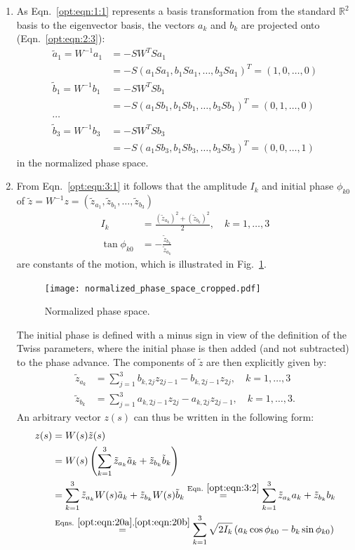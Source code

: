 \documentclass[english]{article}
\begin{document}
\begin{enumerate}
\item As Eqn.~\ref{opt:eqn:1:1} represents a basis transformation from the standard $\mathbb{R}^2$ basis to the eigenvector basis, the vectors $a_k$ and $b_k$ are projected onto (Eqn.~\ref{opt:eqn:2:3}):
\begin{align}\label{opt:eqn:3:2}
\tilde a_1=W^{-1}a_1&=-SW^TSa_1\nonumber\\
&=-S(a_1Sa_1,b_1Sa_1,\ldots,b_3Sa_1)^T=(1,0,\ldots,0)\nonumber\\
\tilde b_1=W^{-1}b_1&=-SW^TSb_1\nonumber\\
&=-S(a_1Sb_1,b_1Sb_1,\ldots,b_3Sb_1)^T=(0,1,\ldots,0)\\
\cdots & \nonumber\\
\tilde b_3=W^{-1}b_3&=-SW^TSb_3\nonumber\\
&=-S(a_1Sb_3,b_1Sb_3,\ldots,b_3Sb_3)^T=(0,0,\ldots,1)\nonumber
\end{align}
in the normalized phase space.
\item From Eqn.~\ref{opt:eqn:3:1} it follows that the amplitude $I_k$ and initial phase $\phi_{k0}$ of $\tilde z=W^{-1}z=(\tilde z_{a_1},\tilde z_{b_1},\ldots,\tilde z_{b_3})$ 
\begin{align}
I_k&=\frac{(\tilde z_{a_k})^2 +(\tilde z_{b_k})^2}{2}, \quad k=1,\ldots,3\label{opt:eqn:20a}\\
\tan\phi_{k0}&=-\frac{\tilde z_{b_k}}{\tilde z_{a_k}} \label{opt:eqn:20b}
\end{align}
are constants of the motion, which is illustrated in Fig.~\ref{opt:fig:1}.
\begin{figure}[h]
	\centering
	\texttt{[image: normalized\_phase\_space\_cropped.pdf]}
	\caption{Normalized phase space.\label{opt:fig:1}}
\end{figure}
The initial phase is defined with a minus sign in view of the definition of the Twiss parameters, where the initial phase is then added (and not subtracted) to the phase advance. The components of $\tilde z$ are then explicitly given by:
\begin{align}
\tilde z_{a_k}&= \sum_{j=1}^3  b_{k,2j} z_{2j-1}- b_{k,2j-1} z_{2j}, \quad k=1,\ldots,3\\
\tilde z_{b_k}&= \sum_{j=1}^3 a_{k,2j-1} z_{2j}- a_{k,2j} z_{2j-1}, \quad k=1,\ldots,3.
\end{align}
An arbitrary vector $z(s)$ can thus be written in the following form:
\begin{align}
 z(s)&=W(s)\tilde z(s)\nonumber\\
 &=W(s)\left(\sum_{k=1}^{3}\tilde z_{a_k}\tilde a_k + \tilde z_{b_k}\tilde b_k\right)\nonumber\\
 &=\sum_{k=1}^{3}\tilde z_{a_k}W(s)\tilde a_k + \tilde z_{b_k}W(s)\tilde b_k\overset{\rm Eqn.~\ref{opt:eqn:3:2}}{=}\sum_{k=1}^{3}\tilde z_{a_k}a_k + \tilde z_{b_k}b_k\nonumber\\
 &\overset{\rm Eqns.~\ref
 	{opt:eqn:20a},\ref{opt:eqn:20b}}=\sum_{k=1}^{3}\sqrt{2I_k}\left(a_k\cos{\phi_{k0}}-b_k\sin{\phi_{k0}}\right)
\end{align}
\end{enumerate}
\end{document}

